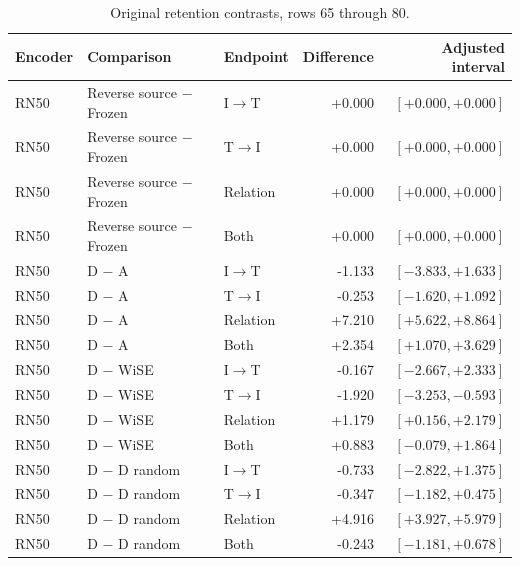 \begin{table}[t]
\centering
\small
\setlength{\tabcolsep}{3pt}
\begin{tabular}{lllrr}
\toprule
Encoder & Comparison & Endpoint & Difference & Adjusted interval\\
\midrule
RN50 & Reverse source $-$ Frozen & I$\to$T & +0.000 & $[+0.000,+0.000]$ \\
RN50 & Reverse source $-$ Frozen & T$\to$I & +0.000 & $[+0.000,+0.000]$ \\
RN50 & Reverse source $-$ Frozen & Relation & +0.000 & $[+0.000,+0.000]$ \\
RN50 & Reverse source $-$ Frozen & Both & +0.000 & $[+0.000,+0.000]$ \\
RN50 & D $-$ A & I$\to$T & -1.133 & $[-3.833,+1.633]$ \\
RN50 & D $-$ A & T$\to$I & -0.253 & $[-1.620,+1.092]$ \\
RN50 & D $-$ A & Relation & +7.210 & $[+5.622,+8.864]$ \\
RN50 & D $-$ A & Both & +2.354 & $[+1.070,+3.629]$ \\
RN50 & D $-$ WiSE & I$\to$T & -0.167 & $[-2.667,+2.333]$ \\
RN50 & D $-$ WiSE & T$\to$I & -1.920 & $[-3.253,-0.593]$ \\
RN50 & D $-$ WiSE & Relation & +1.179 & $[+0.156,+2.179]$ \\
RN50 & D $-$ WiSE & Both & +0.883 & $[-0.079,+1.864]$ \\
RN50 & D $-$ D random & I$\to$T & -0.733 & $[-2.822,+1.375]$ \\
RN50 & D $-$ D random & T$\to$I & -0.347 & $[-1.182,+0.475]$ \\
RN50 & D $-$ D random & Relation & +4.916 & $[+3.927,+5.979]$ \\
RN50 & D $-$ D random & Both & -0.243 & $[-1.181,+0.678]$ \\
\bottomrule
\end{tabular}
\caption{Original retention contrasts, rows 65 through 80.}\label{tab:originalretention64}
\end{table}


